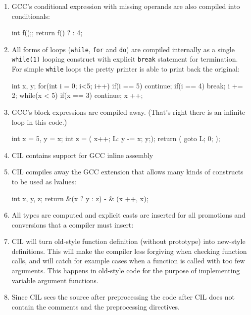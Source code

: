\documentclass[letterpaper]{article}
\def\t#1{{\tt #1}}
\begin{document}
\begin{enumerate}
\item GCC's conditional expression with missing operands are also compiled
into conditionals:
\begin{cilcode}[local]
  int f();;
  return f() ? : 4;
\end{cilcode}

\item All forms of loops (\t{while}, \t{for} and \t{do}) are compiled
internally as a single \t{while(1)} looping construct with explicit \t{break}
statement for termination. For simple \t{while} loops the pretty printer is
able to print back the original:
\begin{cilcode}[local]
   int x, y;
   for(int i = 0; i<5; i++) {
      if(i == 5) continue;
      if(i == 4) break;
      i += 2;
   }
   while(x < 5) {
     if(x == 3) continue;
     x ++;
   }
\end{cilcode}

\item GCC's block expressions are compiled away. (That's right there is an
infinite loop in this code.)

\begin{cilcode}[local]
   int x = 5, y = x;
   int z = ({ x++; L: y -= x; y;});
   return ({ goto L; 0; });
\end{cilcode}

\item CIL contains support for GCC inline assembly

\item CIL compiles away the GCC extension that allows many kinds of constructs
to be used as lvalues:

\begin{cilcode}[local]
   int x, y, z;
   return &(x ? y : z) - & (x ++, x);
\end{cilcode}

\item All types are computed and explicit casts are inserted for all
promotions and conversions that a compiler must insert:

\item CIL will turn old-style function definition (without prototype) into
new-style definitions. This will make the compiler less forgiving when
checking function calls, and will catch for example cases when a function is
called with too few arguments. This happens in old-style code for the purpose
of implementing variable argument functions.

\item Since CIL sees the source after preprocessing the code after CIL does
not contain the comments and the preprocessing directives.


\end{enumerate}
\end{document}
